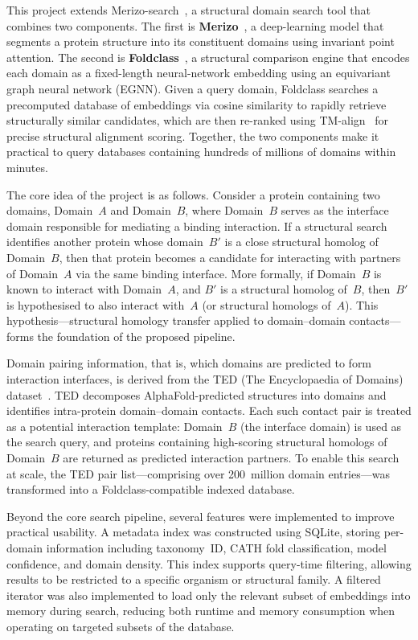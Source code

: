 This project extends Merizo-search~\cite{merizo_search}, a structural domain search tool that combines two components.
The first is \textbf{Merizo}~\cite{merizo}, a deep-learning model that segments a protein structure into its constituent domains using invariant point attention.
The second is \textbf{Foldclass}~\cite{merizo_search}, a structural comparison engine that encodes each domain as a fixed-length neural-network embedding using an equivariant graph neural network (EGNN).
Given a query domain, Foldclass searches a precomputed database of embeddings via cosine similarity to rapidly retrieve structurally similar candidates, which are then re-ranked using TM-align~\cite{tmalign} for precise structural alignment scoring.
Together, the two components make it practical to query databases containing hundreds of millions of domains within minutes.

The core idea of the project is as follows.
Consider a protein containing two domains, Domain~$A$ and Domain~$B$, where Domain~$B$ serves as the interface domain responsible for mediating a binding interaction.
If a structural search identifies another protein whose domain~$B'$ is a close structural homolog of Domain~$B$, then that protein becomes a candidate for interacting with partners of Domain~$A$ via the same binding interface.
More formally, if Domain~$B$ is known to interact with Domain~$A$, and $B'$ is a structural homolog of~$B$, then~$B'$ is hypothesised to also interact with~$A$ (or structural homologs of~$A$).
This hypothesis---structural homology transfer applied to domain--domain contacts---forms the foundation of the proposed pipeline.

Domain pairing information, that is, which domains are predicted to form interaction interfaces, is derived from the TED (The Encyclopaedia of Domains) dataset~\cite{ted_dataset}.
TED decomposes AlphaFold-predicted structures into domains and identifies intra-protein domain--domain contacts.
Each such contact pair is treated as a potential interaction template: Domain~$B$ (the interface domain) is used as the search query, and proteins containing high-scoring structural homologs of Domain~$B$ are returned as predicted interaction partners.
To enable this search at scale, the TED pair list---comprising over 200~million domain entries---was transformed into a Foldclass-compatible indexed database.

Beyond the core search pipeline, several features were implemented to improve practical usability.
A metadata index was constructed using SQLite, storing per-domain information including taxonomy~ID, CATH fold classification, model confidence, and domain density.
This index supports query-time filtering, allowing results to be restricted to a specific organism or structural family.
A filtered iterator was also implemented to load only the relevant subset of embeddings into memory during search, reducing both runtime and memory consumption when operating on targeted subsets of the database.

